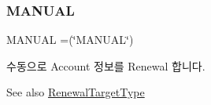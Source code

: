 \subsubsection{\texorpdfstring{M\+A\+N\+U\+AL}{MANUAL}}
{\footnotesize\ttfamily M\+A\+N\+U\+AL =(\char`\"{}M\+A\+N\+U\+AL\char`\"{})}



수동으로 Account 정보를 Renewal 합니다. 

\begin{DoxySeeAlso}{See also}
\hyperlink{enumcom_1_1toast_1_1android_1_1gamebase_1_1auth_1_1transfer_1_1data_1_1_renewal_target_type}{Renewal\+Target\+Type} 
\end{DoxySeeAlso}
